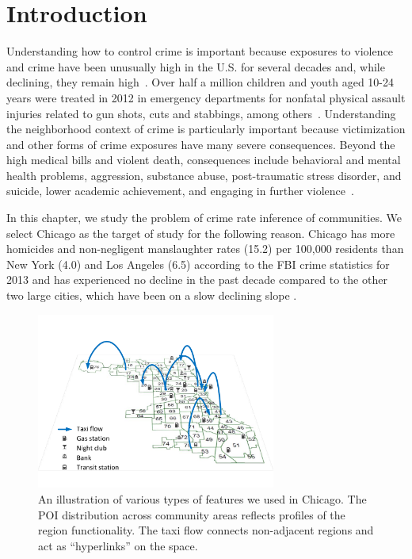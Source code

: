 
\section{Introduction}

Understanding how to control crime is important because exposures to violence and crime have been unusually high in the U.S. for several decades and, while declining, they remain high~\cite{Baum05, Fink08}. Over half a million children and youth aged 10-24 years were treated in 2012 in emergency departments for nonfatal physical assault injuries related to gun shots, cuts and stabbings, among others~\cite{cdc15}.  Understanding the neighborhood context of crime is particularly important because victimization and other forms of crime exposures have many severe consequences.  Beyond the high medical bills and violent death, consequences include behavioral and mental health problems, aggression, substance abuse, post-traumatic stress disorder, and suicide, lower academic achievement, and engaging in further violence~\cite{Grai15}. 

In this chapter, we study the problem of crime rate inference of communities. We select Chicago as the target of study for the following reason. Chicago has more homicides and non-negligent manslaughter rates (15.2)
per 100,000 residents than New York (4.0) and Los Angeles (6.5)
according to the FBI crime statistics for 2013 and has experienced no
decline in the past decade compared to the other two large cities,
which have been on a slow declining slope \cite{crime-stats}.


\begin{figure}[t]
\centering
\includegraphics[width=0.7\textwidth]{fig/demo-kdd16.pdf}
\vspace{-5mm}
\caption{An illustration of various types of features we used in Chicago. The POI distribution across community areas reflects profiles of the region functionality. The taxi flow connects non-adjacent regions and act as ``hyperlinks'' on the space.}
\label{fig:demo}
\vspace{-6mm}
\end{figure}

